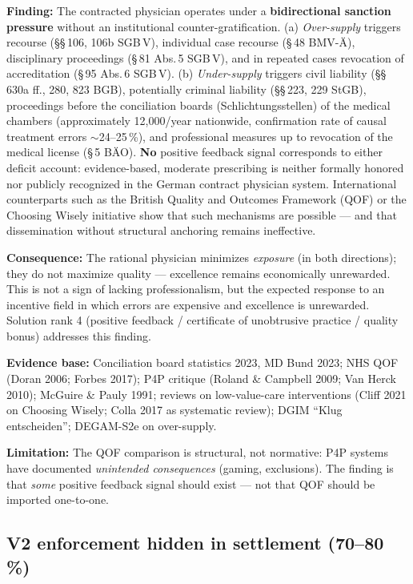 \documentclass{umbruch-position}
\providecommand{\textgerman}[1]{#1}
\begin{document}
\textbf{Finding:} The contracted physician operates under a \textbf{bidirectional sanction pressure} without an institutional counter-gratification. (a) \emph{Over-supply} triggers recourse (\S\S\,106, 106b SGB\,V), individual case recourse (\S\,48 BMV-\"A), disciplinary proceedings (\S\,81 Abs.\,5 SGB\,V), and in repeated cases revocation of accreditation (\S\,95 Abs.\,6 SGB\,V). (b) \emph{Under-supply} triggers civil liability (\S\S\,630a ff., 280, 823 BGB), potentially criminal liability (\S\S\,223, 229 StGB), proceedings before the conciliation boards (\textgerman{Schlichtungsstellen}) of the medical chambers (approximately 12,000/year nationwide, confirmation rate of causal treatment errors $\sim$24--25\,\%), and professional measures up to revocation of the medical license (\S\,5 B\"AO). \textbf{No} positive feedback signal corresponds to either deficit account: evidence-based, moderate prescribing is neither formally honored nor publicly recognized in the German contract physician system. International counterparts such as the British Quality and Outcomes Framework (QOF) or the Choosing Wisely initiative show that such mechanisms are possible --- and that dissemination without structural anchoring remains ineffective.

\textbf{Consequence:} The rational physician minimizes \emph{exposure} (in both directions); they do not maximize quality --- excellence remains economically unrewarded. This is not a sign of lacking professionalism, but the expected response to an incentive field in which errors are expensive and excellence is unrewarded. Solution rank 4 (positive feedback / certificate of unobtrusive practice / quality bonus) addresses this finding.

\textbf{Evidence base:} Conciliation board statistics 2023, MD Bund 2023; NHS QOF (Doran 2006; Forbes 2017); P4P critique (Roland \& Campbell 2009; Van Herck 2010); McGuire \& Pauly 1991; reviews on low-value-care interventions (Cliff 2021 on Choosing Wisely; Colla 2017 as systematic review); DGIM ``Klug entscheiden''; DEGAM-S2e on over-supply.

\textbf{Limitation:} The QOF comparison is structural, not normative: P4P systems have documented \emph{unintended consequences} (gaming, exclusions). The finding is that \emph{some} positive feedback signal should exist --- not that QOF should be imported one-to-one.

\subsection{V2 enforcement hidden in settlement (70--80\,\%)}
\end{document}

